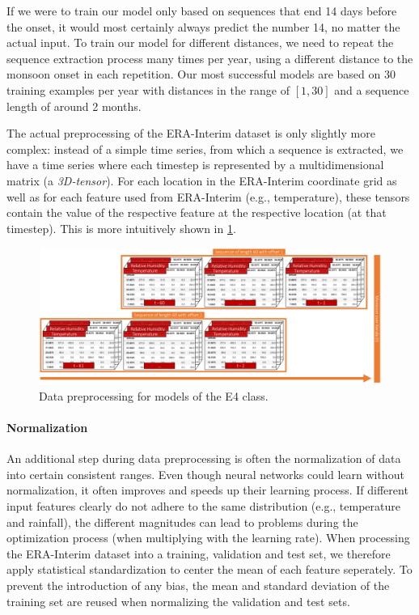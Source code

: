 If we were to train our model only based on sequences that end 14 days before the onset, it would most certainly always predict the number 14, no matter the actual input. To train our model for different distances, we need to repeat the sequence extraction process many times per year, using a different distance to the monsoon onset in each repetition. Our most successful models are based on 30 training examples per year with distances in the range of $[1, 30]$ and a sequence length of around 2 months.

The actual preprocessing of the ERA-Interim dataset is only slightly more complex: instead of a simple time series, from which a sequence is extracted, we have a time series where each timestep is represented by a multidimensional matrix (a \textit{3D-tensor}). For each location in the ERA-Interim coordinate grid as well as for each feature used from ERA-Interim (e.g., temperature), these tensors contain the value of the respective feature at the respective location (at that timestep). This is more intuitively shown in \cref{fig:e4_preprocessing}.

\begin{figure}[h]
  \centering
  \includegraphics[width=\linewidth]{./99_appendix/img/E4_preprocessing}
  \caption{Data preprocessing for models of the E4 class.}
  \label{fig:e4_preprocessing}
\end{figure}

\paragraph{Normalization} An additional step during data preprocessing is often the normalization of data into certain consistent ranges. Even though neural networks could learn without normalization, it often improves and speeds up their learning process. If different input features clearly do not adhere to the same distribution (e.g., temperature and rainfall), the different magnitudes can lead to problems during the optimization process (when multiplying with the learning rate). When processing the ERA-Interim dataset into a training, validation and test set, we therefore apply statistical standardization to center the mean of each feature seperately. To prevent the introduction of any bias, the mean and standard deviation of the training set are reused when normalizing the validation and test sets.

